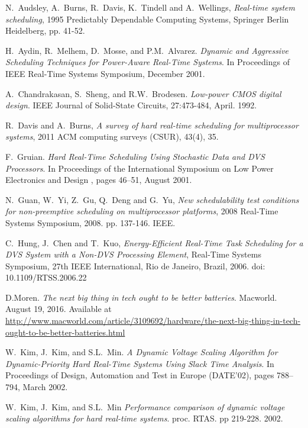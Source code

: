 \documentclass[10pt,article]{IEEEtran}
\begin{document}
\begin{thebibliography}{1}

N.~Audsley, A.~Burns, R.~Davis, K.~Tindell and A.~Wellings, \emph{Real-time system scheduling}, 1995 Predictably Dependable Computing Systems, Springer Berlin Heidelberg, pp. 41-52.

H.~Aydin, R.~Melhem, D.~Mosse, and P.M.~Alvarez. \emph{Dynamic  and  Aggressive  Scheduling  Techniques  for  Power-Aware  Real-Time Systems}. In Proceedings  of IEEE Real-Time Systems Symposium, December 2001.

A.~Chandrakasan, S.~Sheng, and R.W.~Brodesen. \emph{Low-power CMOS digital design}. IEEE Journal of Solid-State Circuits, 27:473-484, April. 1992.

R.~Davis and A.~Burns, \emph{A survey of hard real-time scheduling for multiprocessor systems}, 2011 ACM computing surveys (CSUR), 43(4), 35.

F.~Gruian. \emph{Hard Real-Time Scheduling Using Stochastic Data and  DVS  Processors}. In Proceedings  of  the  International Symposium on Low Power Electronics and Design , pages 46–51, August 2001.

N.~Guan, W.~Yi, Z.~Gu, Q.~Deng and G.~Yu, \emph{New schedulability test conditions for non-preemptive scheduling on multiprocessor platforms}, 2008 Real-Time Systems Symposium, 2008. pp. 137-146. IEEE.

C.~Hung, J.~Chen and T.~Kuo, \emph{Energy-Efficient Real-Time Task Scheduling for a DVS System with a Non-DVS Processing Element},  Real-Time Systems Symposium, 27th IEEE International, Rio de Janeiro, Brazil, 2006. doi: 10.1109/RTSS.2006.22

D.Moren. \emph{The next big thing in tech ought to be better batteries}. Macworld. August 19, 2016. Available at \url{http://www.macworld.com/article/3109692/hardware/the-next-big-thing-in-tech-ought-to-be-better-batteries.html}

W.~Kim, J.~Kim, and S.L.~Min. \emph{A Dynamic Voltage Scaling  Algorithm  for  Dynamic-Priority  Hard  Real-Time  Systems Using Slack Time Analysis}. In Proceedings of Design, Automation and Test in Europe (DATE'02), pages 788–794, March 2002.

W.~Kim, J.~Kim, and S.L.~Min \emph{Performance comparison of dynamic voltage scaling algorithms for hard real-time systems}. proc. RTAS. pp 219-228. 2002.


\end{thebibliography}
\end{document}
